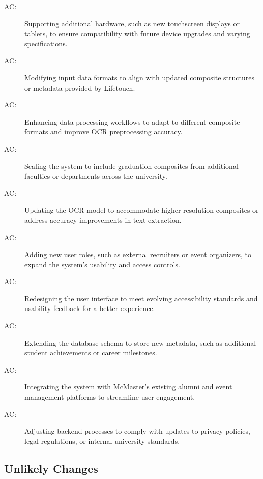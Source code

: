 \documentclass[12pt, titlepage]{article}
\newcounter{acnum}
\newcommand{\actheacnum}{AC\theacnum}
\begin{document}
\begin{description}
\item[ \actheacnum \label{ac1}:] Supporting additional hardware, such as new touchscreen displays or tablets, to ensure compatibility with future device upgrades and varying specifications.
\item[ \actheacnum \label{ac2}:] Modifying input data formats to align with updated composite structures or metadata provided by Lifetouch.
\item [ \actheacnum \label{ac3}:] Enhancing data processing workflows to adapt to different composite formats and improve OCR preprocessing accuracy.
  \item [ \actheacnum \label{ac4}:] Scaling the system to include graduation composites from additional faculties or departments across the university.
  \item [ \actheacnum \label{ac5}:] Updating the OCR model to accommodate higher-resolution composites or address accuracy improvements in text extraction.
  \item [ \actheacnum \label{ac6}:] Adding new user roles, such as external recruiters or event organizers, to expand the system's usability and access controls.
  \item [ \actheacnum \label{ac7}:] Redesigning the user interface to meet evolving accessibility standards and usability feedback for a better experience.
  \item [ \actheacnum \label{ac8}:] Extending the database schema to store new metadata, such as additional student achievements or career milestones.
  \item [ \actheacnum \label{ac9}:] Integrating the system with McMaster’s existing alumni and event management platforms to streamline user engagement.
  \item [ \actheacnum \label{ac10}:] Adjusting backend processes to comply with updates to privacy policies, legal regulations, or internal university standards.
\end{description}


\subsection{Unlikely Changes} \label{SecUchange}
\end{document}
